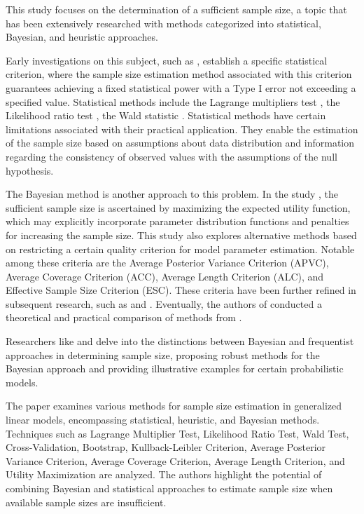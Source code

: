 \documentclass[runningheads]{llncs}
\begin{document}
This study focuses on the determination of a sufficient sample size, a topic that has been extensively researched with methods categorized into statistical, Bayesian, and heuristic approaches.

Early investigations on this subject, such as \cite{Adcock1988,Joseph1995}, establish a specific statistical criterion, where the sample size estimation method associated with this criterion guarantees achieving a fixed statistical power with a Type I error not exceeding a specified value. Statistical methods include the Lagrange multipliers test \cite{self1988power}, the Likelihood ratio test \cite{shieh2000power}, the Wald statistic \cite{shieh2005power}. Statistical methods have certain limitations associated with their practical application. They enable the estimation of the sample size based on assumptions about data distribution and information regarding the consistency of observed values with the assumptions of the null hypothesis.

The Bayesian method is another approach to this problem. In the study \cite{Lindley1997}, the sufficient sample size is ascertained by maximizing the expected utility function, which may explicitly incorporate parameter distribution functions and penalties for increasing the sample size. This study also explores alternative methods based on restricting a certain quality criterion for model parameter estimation. Notable among these criteria are the Average Posterior Variance Criterion (APVC), Average Coverage Criterion (ACC), Average Length Criterion (ALC), and Effective Sample Size Criterion (ESC). These criteria have been further refined in subsequent research, such as \cite{PhamGia1997} and \cite{Gelfand2002}. Eventually, the authors of \cite{Cao2009} conducted a theoretical and practical comparison of methods from \cite{Adcock1988,Joseph1995,Lindley1997}.

Researchers like \cite{Brutti2014} and \cite{Pezeshk2008} delve into the distinctions between Bayesian and frequentist approaches in determining sample size, proposing robust methods for the Bayesian approach and providing illustrative examples for certain probabilistic models.

The paper \cite{Grabovoy2022} examines various methods for sample size estimation in generalized linear models, encompassing statistical, heuristic, and Bayesian methods. Techniques such as Lagrange Multiplier Test, Likelihood Ratio Test, Wald Test, Cross-Validation, Bootstrap, Kullback-Leibler Criterion, Average Posterior Variance Criterion, Average Coverage Criterion, Average Length Criterion, and Utility Maximization are analyzed. The authors highlight the potential of combining Bayesian and statistical approaches to estimate sample size when available sample sizes are insufficient.
\end{document}
